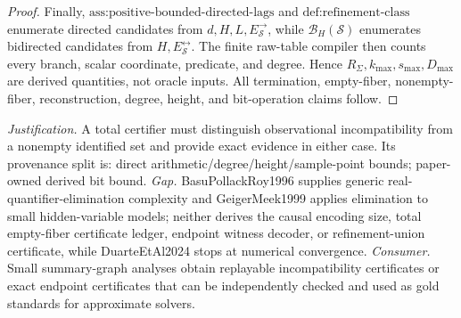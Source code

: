 \documentclass{article}
\begin{document}
\begin{proof}
Finally, \(\text{ass:positive-bounded-directed-lags}\) and \(\text{def:refinement-class}\) enumerate directed candidates from \(d,H,L,E_{\mathcal S}^{\to}\), while \(\mathcal B_H(\mathcal S)\) enumerates bidirected candidates from \(H,E_{\mathcal S}^{\leftrightarrow}\).  The finite raw-table compiler then counts every branch, scalar coordinate, predicate, and degree.  Hence \(R_{\Sigma},k_{\max},s_{\max},D_{\max}\) are derived quantities, not oracle inputs.  All termination, empty-fiber, nonempty-fiber, reconstruction, degree, height, and bit-operation claims follow.
\end{proof}
\par\smallskip\noindent \textit{Justification.} A total certifier must distinguish observational incompatibility from a nonempty identified set and provide exact evidence in either case. Its provenance split is: direct arithmetic/degree/height/sample-point bounds; paper-owned derived bit bound. \textit{Gap.} BasuPollackRoy1996 supplies generic real-quantifier-elimination complexity and GeigerMeek1999 applies elimination to small hidden-variable models; neither derives the causal encoding size, total empty-fiber certificate ledger, endpoint witness decoder, or refinement-union certificate, while DuarteEtAl2024 stops at numerical convergence. \textit{Consumer.} Small summary-graph analyses obtain replayable incompatibility certificates or exact endpoint certificates that can be independently checked and used as gold standards for approximate solvers.
\end{document}

